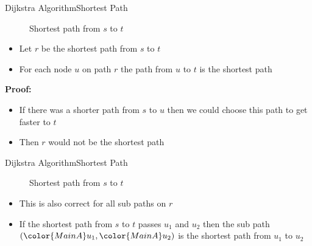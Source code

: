 \begin{frame}{Dijkstra Algorithm}{Shortest Path}
  \vspace{-1.5em}
  \begin{figure}
    \begin{adjustbox}{width=0.75\linewidth}
      
    \end{adjustbox}
    \label{fig:dijkstra:shortest_path_introduction}
    \caption{Shortest path from {\color{MainA}$s$} to
    {\color{MainA}$t$}}
  \end{figure}
  \vspace{-1.5em}
  \begin{itemize}
    \item
      Let {\color{MainB}$r$} be the shortest path from
      {\color{MainA}$s$} to {\color{MainA}$t$}
    \item
      For each node {\color{MainA}$u$} on path {\color{MainB}$r$}
      the path from {\color{MainA}$u$} to {\color{MainA}$t$} is
      the shortest path
  \end{itemize}
  \textbf{Proof:}
  \begin{itemize}
    \item
      If there was a shorter path from {\color{MainA}$s$} to
      {\color{MainA}$u$} then we could choose this path to get faster to
      {\color{MainA}$t$}
    \item
      Then {\color{MainB}$r$} would not be the shortest path
  \end{itemize}
\end{frame}


\begin{frame}{Dijkstra Algorithm}{Shortest Path}
  \vspace{-1.5em}
  \begin{figure}
    \begin{adjustbox}{width=0.75\linewidth}
      
    \end{adjustbox}
    \label{fig:dijkstra:shortest_path_introduction_re}
    \caption{Shortest path from {\color{MainA}$s$} to
      {\color{MainA}$t$}}
  \end{figure}
  \vspace{-1.5em}
  \begin{itemize}
    \item
      This is also correct for all sub paths on {\color{MainB}$r$}
    \item
      If the shortest path from {\color{MainA}$s$} to
      {\color{MainA}$t$} passes {\color{MainA}$u_1$} and
      {\color{MainA}$u_2$} then the sub path
      $({\color{MainA}u_1}, {\color{MainA}u_2})$
      is the shortest path from {\color{MainA}$u_1$} to
      {\color{MainA}$u_2$}
  \end{itemize}
\end{frame}

